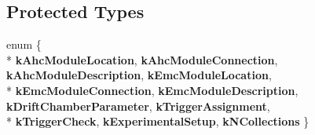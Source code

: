 \subsection*{Protected Types}
\begin{DoxyCompactItemize}
\item 
enum \{ \\*
{\bfseries k\-Ahc\-Module\-Location}, 
{\bfseries k\-Ahc\-Module\-Connection}, 
{\bfseries k\-Ahc\-Module\-Description}, 
{\bfseries k\-Emc\-Module\-Location}, 
\\*
{\bfseries k\-Emc\-Module\-Connection}, 
{\bfseries k\-Emc\-Module\-Description}, 
{\bfseries k\-Drift\-Chamber\-Parameter}, 
{\bfseries k\-Trigger\-Assignment}, 
\\*
{\bfseries k\-Trigger\-Check}, 
{\bfseries k\-Experimental\-Setup}, 
{\bfseries k\-N\-Collections}
 \}
\end{DoxyCompactItemize}
